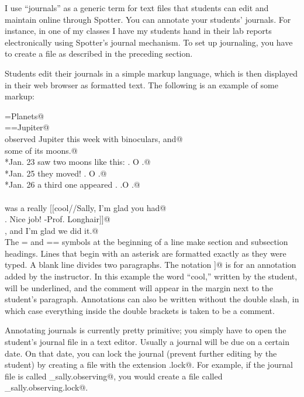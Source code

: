 \documentclass{doc}
\begin{document}
\label{journals}
I use ``journals'' as a generic term for text files that students can edit and maintain
online through Spotter. You can annotate your students' journals. For instance, in one
of my classes I have my students hand in their lab reports electronically using Spotter's
journal mechanism.
To set up journaling, you have to create a \verb@journals@ file as described in the
preceding section.

Students edit their journals in a simple markup language, which is then displayed in
their web browser as formatted text. The following is an example of some markup:

\verb@=Planets@\\
\verb@==Jupiter@\\
\verb@I observed Jupiter this week with binoculars, and@\\
\verb@saw some of its moons.@\\
\verb@*Jan. 23       saw two moons like this:    .   O .@\\
\verb@*Jan. 25       they moved!                .    O  .@\\
\verb@*Jan. 26       a third one appeared       .   .O   .@\\
\verb@@\\
\verb@This was a really [[cool//Sally, I'm glad you had@\\
\verb@fun. Nice job! -Prof. Longhair]]@\\
\verb@project, and I'm glad we did it.@\\

The = and == symbols at the beginning of a line make section and subsection headings.
Lines that begin with an asterisk are formatted exactly as they were typed. A blank
line divides two paragraphs. The notation \verb@[[ // ]]@ is for an annotation added by the
instructor. In this example the word ``cool,'' written by the student, will be underlined, and the
comment will appear in the margin next to the student's paragraph. Annotations can also be
written without the double slash, in which case everything inside the double brackets is
taken to be a comment.

Annotating journals is currently pretty primitive; you simply have to open the
student's journal file in a text editor.
Usually a journal will be due on a certain date. On that date, you can lock the
journal (prevent further editing by the student)
by creating a file with the extension \verb@.lock@. For example, if the
journal file is called \verb@jones_sally.observing@, you would create a file
called \verb@jones_sally.observing.lock@.
\end{document}
